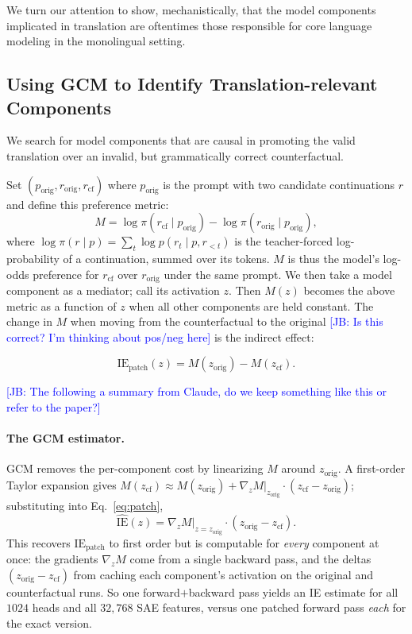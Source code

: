 \documentclass[11pt]{article}
\newcommand{\jb}[1]{\textcolor{blue}{[JB: #1]}}
\begin{document}
We turn our attention to show, mechanistically, that the model components implicated in translation are oftentimes those responsible for core language modeling in the monolingual setting.

\subsection{Using GCM to Identify Translation-relevant Components}

We search for model components that are causal in promoting the valid translation over an invalid, but grammatically correct counterfactual.

Set $(p_{\text{orig}}, r_{\text{orig}}, r_{\text{cf}})$ where $p_{\text{orig}}$ is the prompt with two candidate continuations $r$ and define this preference metric:
\begin{equation}
M = \log \pi(r_{\text{cf}}\mid p_{\text{orig}}) - \log \pi(r_{\text{orig}}\mid p_{\text{orig}}),
\label{eq:metric}
\end{equation}
where $\log\pi(r\mid p) = \sum_t \log p(r_t \mid p, r_{<t})$ is the
teacher-forced log-probability of a continuation, summed over its tokens. $M$ is thus the model's log-odds preference for $r_{\text{cf}}$ over $r_{\text{orig}}$ under the same prompt. We then take a model component as a mediator; call its activation $z$. Then $M(z)$ becomes the above metric as a function of $z$ when all other components are held constant. The change in $M$ when moving from the counterfactual to the original \jb{Is this correct? I'm thinking about pos/neg here} is the indirect effect:

\begin{equation}
\mathrm{IE}_{\text{patch}}(z) = M(z_{\text{orig}}) - M(z_{\text{cf}}).
\label{eq:patch}
\end{equation}

\jb{The following a summary from Claude, do we keep something like this or refer to the paper?}
\paragraph{The GCM estimator.} GCM \citep{sankaranarayanan2026gcm} removes the
per-component cost by linearizing $M$ around $z_{\text{orig}}$. A first-order
Taylor expansion gives $M(z_{\text{cf}}) \approx M(z_{\text{orig}}) + \nabla_z
M|_{z_{\text{orig}}}\!\cdot(z_{\text{cf}} - z_{\text{orig}})$; substituting into
Eq.~\ref{eq:patch},
\begin{equation}
\widehat{\mathrm{IE}}(z) = \nabla_z M\big|_{z=z_{\text{orig}}} \cdot (z_{\text{orig}} - z_{\text{cf}}).
\label{eq:ie}
\end{equation}
This recovers $\mathrm{IE}_{\text{patch}}$ to first order but is computable for
\emph{every} component at once: the gradients $\nabla_z M$ come from a single
backward pass, and the deltas $(z_{\text{orig}} - z_{\text{cf}})$ from caching
each component's activation on the original and counterfactual runs. So one
forward$+$backward pass yields an IE estimate for all $1024$ heads and all
$32{,}768$ SAE features, versus one patched forward pass \emph{each} for the
exact version.
\end{document}
